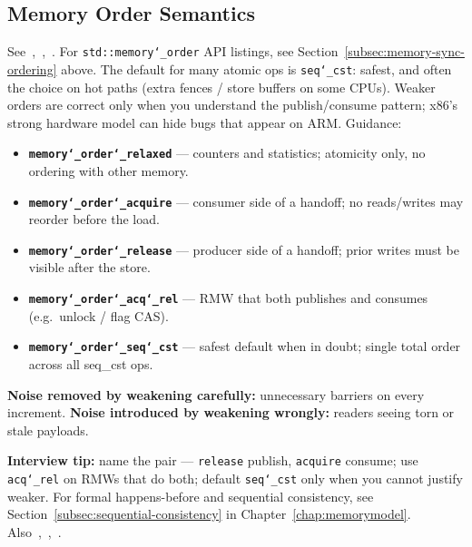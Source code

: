 \subsection{Memory Order Semantics}
\label{subsec:memory-order}
See~\cite{cppreference-memory-order},~\cite{sof-memory-order},~\cite{gnugccwiki-atomicsync}.
\newline
For \texttt{std::memory\char`_order} API listings, see Section~\ref{subsec:memory-sync-ordering} above.
\newline
The default for many atomic ops is \texttt{seq\char`_cst}: safest, and often the 
 choice on hot paths (extra fences / store buffers on some CPUs). 
Weaker orders are correct only when you understand the publish/consume pattern; 
x86's strong hardware model can hide bugs that appear on ARM.
\newline
Guidance:
\begin{itemize}
    \item \textbf{\texttt{memory\char`_order\char`_relaxed}} --- counters and statistics; atomicity only, no ordering with other memory.
    \item \textbf{\texttt{memory\char`_order\char`_acquire}} --- consumer side of a handoff; no reads/writes may reorder before the load.
    \item \textbf{\texttt{memory\char`_order\char`_release}} --- producer side of a handoff; prior writes must be visible after the store.
    \item \textbf{\texttt{memory\char`_order\char`_acq\char`_rel}} --- RMW that both publishes and consumes (e.g.\ unlock / flag CAS).
    \item \textbf{\texttt{memory\char`_order\char`_seq\char`_cst}} --- safest default when in doubt; single total order across all seq\_cst ops.
\end{itemize}
\textbf{Noise removed by weakening carefully:} unnecessary barriers on every increment. 
\textbf{Noise introduced by weakening wrongly:} readers seeing torn or stale payloads.
\par\noindent\textbf{Interview tip:} name the pair --- \texttt{release} publish, 
\texttt{acquire} consume; use \texttt{acq\char`_rel} on RMWs that do both; default 
\texttt{seq\char`_cst} only when you cannot justify weaker.
\newline
For formal happens-before and sequential consistency, see Section~\ref{subsec:sequential-consistency} in Chapter~\ref{chap:memorymodel}.
Also~\cite{data-dependency-ordering},~\cite{youtube-memory-order-1},~\cite{youtube-memory-order-2}.
